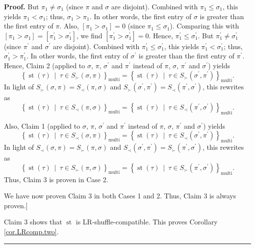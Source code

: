 \documentclass[numbers=enddot,12pt,final,onecolumn,notitlepage]{scrartcl}%
\theoremstyle{definition}
\newenvironment{proof}[1][Proof]{\noindent\textbf{#1.} }{\ \rule{0.5em}{0.5em}}
\begin{document}
\begin{proof}
But $\pi_{1}\neq\sigma_{1}$ (since $\pi$ and $\sigma$ are disjoint). Combined
with $\pi_{1}\leq\sigma_{1}$, this yields $\pi_{1}<\sigma_{1}$; thus,
$\sigma_{1}>\pi_{1}$. In other words, the first entry of $\sigma$ is greater
than the first entry of $\pi$. Also, $\left[  \pi_{1}>\sigma_{1}\right]  =0$
(since $\pi_{1}\leq\sigma_{1}$). Comparing this with $\left[  \pi_{1}%
>\sigma_{1}\right]  =\left[  \pi_{1}^{\prime}>\sigma_{1}^{\prime}\right]  $,
we find $\left[  \pi_{1}^{\prime}>\sigma_{1}^{\prime}\right]  =0$. Hence,
$\pi_{1}^{\prime}\leq\sigma_{1}^{\prime}$. But $\pi_{1}^{\prime}\neq\sigma
_{1}^{\prime}$ (since $\pi^{\prime}$ and $\sigma^{\prime}$ are disjoint).
Combined with $\pi_{1}^{\prime}\leq\sigma_{1}^{\prime}$, this yields $\pi
_{1}^{\prime}<\sigma_{1}^{\prime}$; thus, $\sigma_{1}^{\prime}>\pi_{1}%
^{\prime}$. In other words, the first entry of $\sigma^{\prime}$ is greater
than the first entry of $\pi^{\prime}$. Hence, Claim 2 (applied to $\sigma$,
$\pi$, $\sigma^{\prime}$ and $\pi^{\prime}$ instead of $\pi$, $\sigma$,
$\pi^{\prime}$ and $\sigma^{\prime}$) yields%
\[
\left\{  \operatorname*{st}\left(  \tau\right)  \ \mid\ \tau\in S_{\succ
}\left(  \sigma,\pi\right)  \right\}  _{\operatorname*{multi}}=\left\{
\operatorname*{st}\left(  \tau\right)  \ \mid\ \tau\in S_{\succ}\left(
\sigma^{\prime},\pi^{\prime}\right)  \right\}  _{\operatorname*{multi}}.
\]
In light of $S_{\succ}\left(  \sigma,\pi\right)  =S_{\prec}\left(  \pi
,\sigma\right)  $ and $S_{\succ}\left(  \sigma^{\prime},\pi^{\prime}\right)
=S_{\prec}\left(  \pi^{\prime},\sigma^{\prime}\right)  $, this rewrites as
\[
\left\{  \operatorname*{st}\left(  \tau\right)  \ \mid\ \tau\in S_{\prec
}\left(  \pi,\sigma\right)  \right\}  _{\operatorname*{multi}}=\left\{
\operatorname*{st}\left(  \tau\right)  \ \mid\ \tau\in S_{\prec}\left(
\pi^{\prime},\sigma^{\prime}\right)  \right\}  _{\operatorname*{multi}}.
\]


Also, Claim 1 (applied to $\sigma$, $\pi$, $\sigma^{\prime}$ and $\pi^{\prime
}$ instead of $\pi$, $\sigma$, $\pi^{\prime}$ and $\sigma^{\prime}$) yields%
\[
\left\{  \operatorname*{st}\left(  \tau\right)  \ \mid\ \tau\in S_{\prec
}\left(  \sigma,\pi\right)  \right\}  _{\operatorname*{multi}}=\left\{
\operatorname*{st}\left(  \tau\right)  \ \mid\ \tau\in S_{\prec}\left(
\sigma^{\prime},\pi^{\prime}\right)  \right\}  _{\operatorname*{multi}}.
\]
In light of $S_{\prec}\left(  \sigma,\pi\right)  =S_{\succ}\left(  \pi
,\sigma\right)  $ and $S_{\prec}\left(  \sigma^{\prime},\pi^{\prime}\right)
=S_{\succ}\left(  \pi^{\prime},\sigma^{\prime}\right)  $, this rewrites as%
\[
\left\{  \operatorname*{st}\left(  \tau\right)  \ \mid\ \tau\in S_{\succ
}\left(  \pi,\sigma\right)  \right\}  _{\operatorname*{multi}}=\left\{
\operatorname*{st}\left(  \tau\right)  \ \mid\ \tau\in S_{\succ}\left(
\pi^{\prime},\sigma^{\prime}\right)  \right\}  _{\operatorname*{multi}}.
\]
Thus, Claim 3 is proven in Case 2.

We have now proven Claim 3 in both Cases 1 and 2. Thus, Claim 3 is always proven.]

Claim 3 shows that $\operatorname*{st}$ is LR-shuffle-compatible. This proves
Corollary \ref{cor.LRcomp.two}.
\end{proof}
\end{document}
